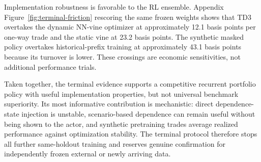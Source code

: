 Implementation robustness is favorable to the RL ensemble. Appendix Figure~\ref{fig:terminal-friction} rescoring the same frozen weights shows that TD3 overtakes the dynamic NN-vine optimizer at approximately 12.1 basis points per one-way trade and the static vine at 23.2 basis points. The synthetic masked policy overtakes historical-prefix training at approximately 43.1 basis points because its turnover is lower. These crossings are economic sensitivities, not additional performance trials.

Taken together, the terminal evidence supports a competitive recurrent portfolio policy with useful implementation properties, but not universal benchmark superiority. Its most informative contribution is mechanistic: direct dependence-state injection is unstable, scenario-based dependence can remain useful without being shown to the actor, and synthetic pretraining trades average realized performance against optimization stability. The terminal protocol therefore stops all further same-holdout training and reserves genuine confirmation for independently frozen external or newly arriving data.
